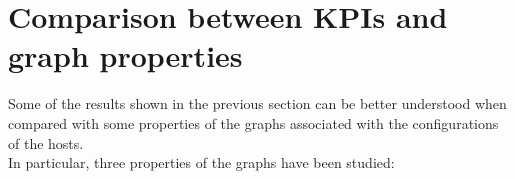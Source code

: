 
\section{Comparison between KPIs and graph properties}

Some of the results shown in the previous section can be better understood when compared with some properties of the graphs associated with the configurations of the hosts.\\
In particular, three properties of the graphs have been studied:

